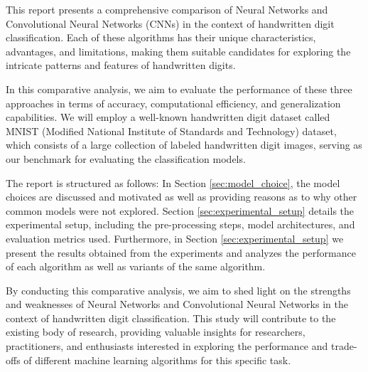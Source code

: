 \documentclass[a4paper,twoside,10pt]{article}
\begin{document}
This report presents a comprehensive comparison of Neural Networks and Convolutional Neural Networks (CNNs) in the context of handwritten digit classification. Each of these algorithms has their unique characteristics, advantages, and limitations, making them suitable candidates for exploring the intricate patterns and features of handwritten digits.

In this comparative analysis, we aim to evaluate the performance of these three approaches in terms of accuracy, computational efficiency, and generalization capabilities. We will employ a well-known handwritten digit dataset called MNIST (Modified National Institute of Standards and Technology) dataset, which consists of a large collection of labeled handwritten digit images, serving as our benchmark for evaluating the classification models.

The report is structured as follows: In Section \ref{sec:model_choice}, the model choices are discussed and motivated as well as providing reasons as to why other common models were not explored. Section \ref{sec:experimental_setup} details the experimental setup, including the pre-processing steps, model architectures, and evaluation metrics used. Furthermore, in Section \ref{sec:experimental_setup} we present the results obtained from the experiments and analyzes the performance of each algorithm as well as variants of the same algorithm.

By conducting this comparative analysis, we aim to shed light on the strengths and weaknesses of Neural Networks and Convolutional Neural Networks in the context of handwritten digit classification. This study will contribute to the existing body of research, providing valuable insights for researchers, practitioners, and enthusiasts interested in exploring the performance and trade-offs of different machine learning algorithms for this specific task.
\end{document}
